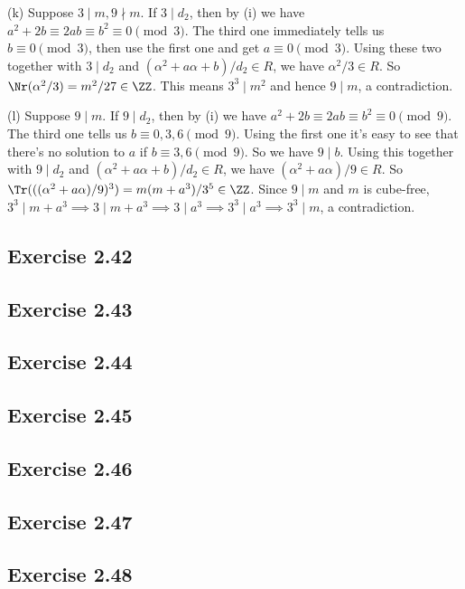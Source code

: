 \documentclass[../Chapter.tex]{subfiles}
\begin{document}
(k) Suppose $3\mid m,9\nmid m$. If $3\mid d_2$, then by (i) we have $a^2+2b\equiv 2ab\equiv b^2 \equiv 0 \pmod{3}$. The third one immediately tells us $b\equiv 0\pmod{3}$, then use the first one and get $a\equiv 0\pmod{3}$. Using these two together with $3\mid d_2$ and $(\alpha^2+a\alpha+b)/d_2\in R$, we have $\alpha^2/3\in R$. So $\Nr(\alpha^2/3)=m^2/27\in\ZZ$. This means $3^3\mid m^2$ and hence $9\mid m$, a contradiction.

(l) Suppose $9\mid m$. If $9\mid d_2$, then by (i) we have $a^2+2b\equiv 2ab\equiv b^2 \equiv 0 \pmod{9}$. The third one tells us $b\equiv 0,3,6\pmod{9}$. Using the first one it's easy to see that there's no solution to $a$ if $b\equiv 3,6\pmod{9}$. So we have $9\mid b$. Using this together with $9\mid d_2$ and $(\alpha^2+a\alpha+b)/d_2\in R$, we have $(\alpha^2+a\alpha)/9\in R$. So $\Tr(((\alpha^2+a\alpha)/9)^3)=m(m+a^3)/3^5\in\ZZ$. Since $9\mid m$ and $m$ is cube-free, $3^3\mid m+a^3 \implies 3\mid m+a^3 \implies 3\mid a^3 \implies 3^3\mid a^3 \implies 3^3\mid m$, a contradiction.

\subsection*{Exercise 2.42}

\subsection*{Exercise 2.43}

\subsection*{Exercise 2.44}

\subsection*{Exercise 2.45}

\subsection*{Exercise 2.46}

\subsection*{Exercise 2.47}

\subsection*{Exercise 2.48}
\phantom{}
\end{document}

